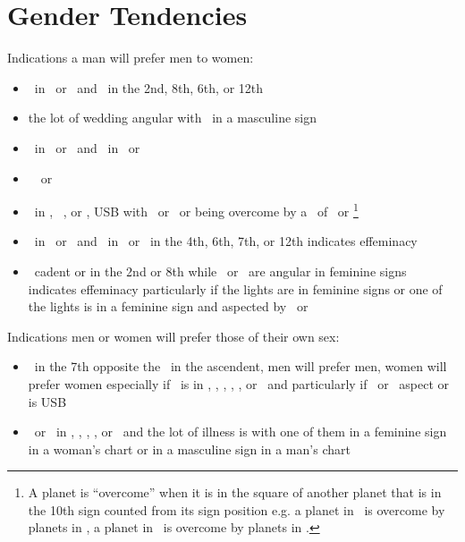 \section{Gender Tendencies}

Indications a man will prefer men to women:
\begin{itemize}[topsep=0em,itemsep=0em]
\item \Venus\, in \Gemini\, or \Virgo\, and \Mercury\, in the 2nd, 8th, 6th, or 12th
\item the lot of wedding angular with \Mercury\, in a masculine sign
\item \Mars\, in \Gemini\, or \Virgo\, and \Mercury\, in \Aries\, or \Scorpio
\item \Mars\, \Square\, or \Opposition\, \Mercury

\item \Venus\,  in \Aries, \Taurus\, \Capricorn, or \Pisces, USB with \Saturn\, or \Mars\, or being overcome by a \Square\, of \Saturn\, or \Mars\footnote{A planet is ``overcome'' when it is in the square of another planet that is  in the 10th sign counted from its sign position e.g. a planet in \Aries\, is overcome by planets in \Capricorn, a planet in \Libra\, is overcome by planets in \Cancer.}

\item \Venus\, in \Capricorn\, or \Aquarius\, and \Saturn\, in \Taurus\, or \Libra\, in the 4th, 6th, 7th, or 12th indicates effeminacy

\item \Venus\, cadent or in the 2nd or 8th while \Saturn\, or \Mars\, are angular in feminine signs indicates effeminacy particularly if the lights are in feminine signs or one of the lights is in a feminine sign and aspected by \Saturn\, or \Mars
\end{itemize}

Indications men or women will prefer those of their own sex:
\begin{itemize}[topsep=0em,itemsep=0em]
\item \Venus\, in the 7th opposite the \Moon\, in the ascendent, men will prefer men, women will prefer women especially if \Venus\, is in \Leo, \Virgo, \Aries, \Scorpio, \Capricorn, or \Aquarius\, and particularly if \Saturn\, or \Mars\, aspect \Venus or \Venus\, is USB

\item \Saturn\, or \Mars\, in \Aries, \Taurus, \Capricorn, \Aquarius, or \Pisces\, and the lot of illness is with one of them in a feminine sign in a woman's chart or in a masculine sign in a man's chart
\end{itemize}


